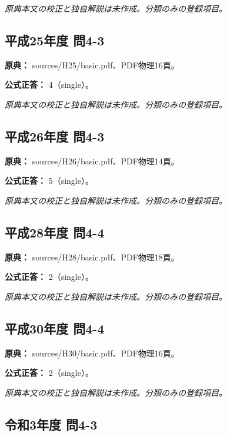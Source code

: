 \par\textit{原典本文の校正と独自解説は未作成。分類のみの登録項目。}

\subsection{平成25年度 問4-3}
\label{q:h25-reg-basic-4-3}

\noindent\textbf{原典：} sources/H25/basic.pdf、PDF物理16頁。

\textbf{公式正答：} 4（single）。

\par\textit{原典本文の校正と独自解説は未作成。分類のみの登録項目。}

\subsection{平成26年度 問4-3}
\label{q:h26-reg-basic-4-3}

\noindent\textbf{原典：} sources/H26/basic.pdf、PDF物理14頁。

\textbf{公式正答：} 5（single）。

\par\textit{原典本文の校正と独自解説は未作成。分類のみの登録項目。}

\subsection{平成28年度 問4-4}
\label{q:h28-reg-basic-4-4}

\noindent\textbf{原典：} sources/H28/basic.pdf、PDF物理18頁。

\textbf{公式正答：} 2（single）。

\par\textit{原典本文の校正と独自解説は未作成。分類のみの登録項目。}

\subsection{平成30年度 問4-4}
\label{q:h30-reg-basic-4-4}

\noindent\textbf{原典：} sources/H30/basic.pdf、PDF物理16頁。

\textbf{公式正答：} 2（single）。

\par\textit{原典本文の校正と独自解説は未作成。分類のみの登録項目。}

\subsection{令和3年度 問4-3}
\label{q:r03-reg-basic-4-3}

